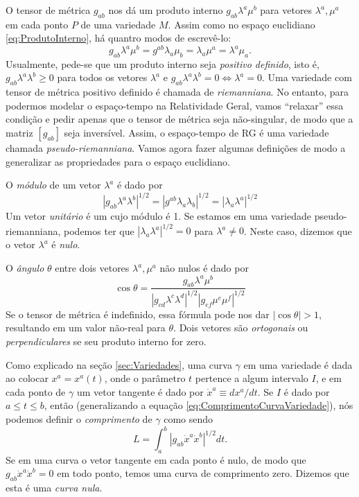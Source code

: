 O tensor de métrica $g_{ab}$ nos dá um produto interno $g_{ab}\lambda^a\mu^b$ para vetores $\lambda^a,\mu^a$ em cada ponto $P$ de uma variedade $M$. Assim como no espaço euclidiano \eqref{eq:ProdutoInterno}, há quantro modos de escrevê-lo:
\begin{equation}
	\boxed{
	g_{ab}\lambda^a\mu^b= g^{ab}\lambda_a\mu_b = \lambda_a\mu^a = \lambda^a\mu_a .
	}
\end{equation}
Usualmente, pede-se que um produto interno seja \textit{positivo definido}, isto é, $g_{ab}\lambda^a\lambda^b\geq 0$ para todos os vetores $\lambda^a$ e $g_{ab}\lambda^a\lambda^b=0 \Leftrightarrow \lambda^a=0$. Uma variedade com tensor de métrica positivo definido é chamada de \textit{riemanniana}. No entanto, para podermos modelar o espaço-tempo na Relatividade Geral, vamos ``relaxar'' essa condição e pedir apenas que o tensor de métrica seja não-singular, de modo que a matriz $[g_{ab}]$ seja inversível. Assim, o espaço-tempo de RG é uma variedade chamada \textit{pseudo-riemanniana}. Vamos agora fazer algumas definições de modo a generalizar as propriedades para o espaço euclidiano.

O \textit{módulo} de um vetor $\lambda^a$ é dado por
\begin{equation}\label{eq:ModuloVetorVariedade}
	\left|g_{a b} \lambda^{a} \lambda^{b}\right|^{1 / 2}=\left|g^{a b} \lambda_{a} \lambda_{b}\right|^{1 / 2}=\left|\lambda_{a} \lambda^{a}\right|^{1 / 2}
\end{equation}
Um vetor \textit{unitário} é um cujo módulo é 1. Se estamos em uma variedade pseudo-riemanniana, podemos ter que $|\lambda_a\lambda^a|^{1/2}=0$ para $\lambda^a\neq0$. Neste caso, dizemos que o vetor $\lambda^a$ é \textit{nulo}.

O \textit{ângulo} $\theta$ entre dois vetores $\lambda^a,\mu^a$ não nulos é dado por
\[
	\cos \theta=\frac{g_{a b} \lambda^{a} \mu^{b}}{\left|g_{c d} \lambda^{c} \lambda^{d}\right|^{1 / 2}\left|g_{e f} \mu^{e} \mu^{f}\right|^{1 / 2}}
\]
Se o tensor de métrica é indefinido, essa fórmula pode nos dar $|\cos\theta|>1$, resultando em um valor não-real para $\theta$. Dois vetores são \textit{ortogonais} ou \textit{perpendiculares} se seu produto interno for zero.

Como explicado na seção \ref{sec:Variedades}, uma curva $\gamma$ em uma variedade é dada ao colocar $x^a=x^a(t)$, onde o parâmetro $t$ pertence a algum intervalo $I$, e em cada ponto de $\gamma$ um vetor tangente é dado por $\dot{x}^a\equiv dx^a/dt$. Se $I$ é dado por $a\leq t\leq b$, então (generalizando a equação \eqref{eq:ComprimentoCurvaVariedade}), nós podemos definir o \textit{comprimento} de $\gamma$ como sendo
\begin{equation}\label{eq:ComprimentoCurvaVariedade}
	\boxed{
	L = \int_a^b |g_{ab}\dot{x}^a\dot{x}^b|^{1/2}dt .
	}
\end{equation}
Se em uma curva o vetor tangente em cada ponto é nulo, de modo que $g_{ab}\dot{x}^a\dot{x}^b=0$ em todo ponto, temos uma curva de comprimento zero. Dizemos que esta é uma \textit{curva nula}.

